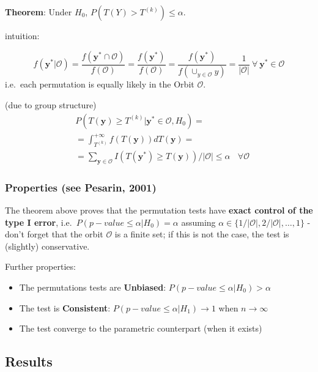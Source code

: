 \documentclass[
]{article}
\providecommand{\tightlist}{%
  \setlength{\itemsep}{0pt}\setlength{\parskip}{0pt}}
\begin{document}
\textbf{Theorem}: Under \(H_0\), \(P(T(Y) > T^{(k)}) \leq \alpha\).

intuition:

\[f(\mathbf{y}^*|\mathcal{O})=\frac{f(\mathbf{y}^*\cap\mathcal{O})}{f(\mathcal{O})}=
\frac{f(\mathbf{y}^*)}{f(\mathcal{O})}=
\frac{f(\mathbf{y}^*)}{f(\cup_{y\in\mathcal{O}}y)}=\frac{1}{|\mathcal{O}|}\ \forall\ \mathbf{y}^*\in \mathcal{O}\]
i.e.~each permutation is equally likely in the Orbit \(\mathcal{O}\).

(due to group structure) \[
\begin{aligned}
&P(T(\mathbf{y})\geq T^{(k)} | \mathbf{y}^*\in\mathcal{O}, H_0)=\\
&=\int_{T^{(k)}}^{+\infty} f(T(\mathbf{y}))dT(\mathbf{y})=\\
&=\sum_{\mathbf{y}\in\mathcal{O}} I(T(\mathbf{y}^*)\geq T(\mathbf{y}))/|\mathcal{O}|\leq \alpha
\ \ \ \ \forall\mathcal{O}
\end{aligned}
\]

\hypertarget{properties-see-pesarin-2001}{%
\subsubsection{Properties (see Pesarin,
2001)}\label{properties-see-pesarin-2001}}

The theorem above proves that the permutation tests have \textbf{exact
control of the type I error}, i.e.~\(P(p-value\leq \alpha|H_0)=\alpha\)
assuming \(\alpha\in \{1/|\mathcal{O}|,2/|\mathcal{O}|,\ldots,1\}\) -
don't forget that the orbit \(\mathcal{O}\) is a finite set; if this is
not the case, the test is (slightly) conservative.

Further properties:

\begin{itemize}
\tightlist
\item
  The permutations tests are \textbf{Unbiased}:
  \(P(p-value\leq \alpha|H_0)>\alpha\)\\
\item
  The test is \textbf{Consistent}: \(P(p-value\leq \alpha|H_1)\to 1\)
  when \(n\to\infty\)\\
\item
  The test converge to the parametric counterpart (when it exists)
\end{itemize}

\hypertarget{results}{%
\subsection{Results}\label{results}}
\end{document}
